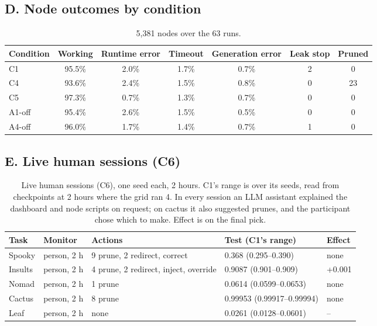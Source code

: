 \documentclass[11pt]{article}
\begin{document}
\subsection*{D. Node outcomes by condition}

\begin{table}[H]
\centering
\small
\begin{tabular}{@{}lcccccc@{}}
\toprule
\textbf{Condition} & \textbf{Working} & \textbf{Runtime error} & \textbf{Timeout}
& \textbf{Generation error} & \textbf{Leak stop} & \textbf{Pruned} \\
\midrule
C1 & 95.5\% & 2.0\% & 1.7\% & 0.7\% & 2 & 0 \\
C4 & 93.6\% & 2.4\% & 1.5\% & 0.8\% & 0 & 23 \\
C5 & 97.3\% & 0.7\% & 1.3\% & 0.7\% & 0 & 0 \\
A1-off & 95.4\% & 2.6\% & 1.5\% & 0.5\% & 0 & 0 \\
A4-off & 96.0\% & 1.7\% & 1.4\% & 0.7\% & 1 & 0 \\
\bottomrule
\end{tabular}
\caption{5,381 nodes over the 63 runs.}
\end{table}

\subsection*{E. Live human sessions (C6)}

\begin{table}[H]
\centering
\footnotesize
\begin{tabular}{@{}lllll@{}}
\toprule
\textbf{Task} & \textbf{Monitor} & \textbf{Actions} & \textbf{Test (C1's range)} & \textbf{Effect} \\
\midrule
Spooky  & person, 2 h & 9 prune, 2 redirect, correct & 0.368 (0.295--0.390) & none \\
Insults & person, 2 h & 4 prune, 2 redirect, inject, override & 0.9087 (0.901--0.909) & +0.001 \\
Nomad   & person, 2 h & 1 prune & 0.0614 (0.0599--0.0653) & none \\
Cactus  & person, 2 h & 8 prune & 0.99953 (0.99917--0.99994) & none \\
Leaf    & person, 2 h & none & 0.0261 (0.0128--0.0601) & -- \\
\bottomrule
\end{tabular}
\caption{Live human sessions (C6), one seed each, 2 hours. C1's range is over its seeds,
read from checkpoints at 2 hours where the grid ran 4. In every session an LLM assistant
explained the dashboard and node scripts on request; on cactus it also suggested prunes,
and the participant chose which to make. Effect is on the final pick.}
\label{tab:c6}
\end{table}
\end{document}
